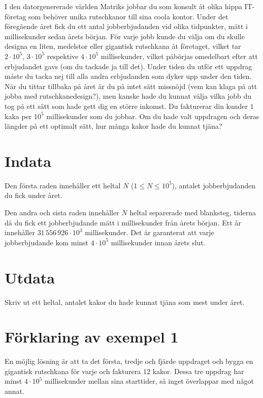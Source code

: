 I den datorgenererade världen Matriks jobbar du som konsult åt olika hippa IT-företag som behöver unika rutschkanor till sina coola kontor.
Under det föregående året fick du ett antal jobberbjudanden vid olika tidpunkter, mätt i millisekunder sedan årets början.
För varje jobb kunde du välja om du skulle designa en liten, medelstor eller gigantisk rutschkana åt företaget, vilket tar $2 \cdot 10^5$, $3 \cdot 10^5$ respektive $4 \cdot 10^5$ millisekunder, vilket påbörjas omedelbart efter att erbjudandet gavs (om du tackade ja till det).
Under tiden du utför ett uppdrag måste du tacka nej till alla andra erbjudanden som dyker upp under den tiden.
När du tittar tillbaka på året är du på intet sätt missnöjd (vem kan klaga på att jobba med rutschkanedesign?), men kanske hade du kunnat välja vilka jobb du tog på ett sätt som hade gett dig en större inkomst.
Du fakturerar din kunder $1$ kaka per $10^5$ millisekunder som du jobbar.
Om du hade valt uppdragen och deras längder på ett optimalt sätt, hur många kakor hade du kunnat tjäna?


\section*{Indata}
Den första raden innehåller ett heltal $N$ ($1 \le N \le 10^5$), antalet jobberbjudanden du fick under året.

Den andra och sista raden innehåller $N$ heltal separerade med blanksteg, tiderna då du fick ett jobberbjudande mätt i millisekunder från årets början.
Ett år innehåller $31\,556\,926 \cdot 10^3$ millisekunder.
Det är garanterat att varje jobberbjudande kom minst $4 \cdot 10^5$ millisekunder innan årets slut.

\section*{Utdata}
Skriv ut ett heltal, antalet kakor du hade kunnat tjäna som mest under året.

\section*{Förklaring av exempel 1}
En möjlig lösning är att ta det första, tredje och fjärde uppdraget och bygga en gigantisk rutschkana för varje och fakturera $12$ kakor.
Dessa tre uppdrag har minst $4 \cdot 10^5$ millisekunder mellan sina starttider, så inget överlappar med något annat.
